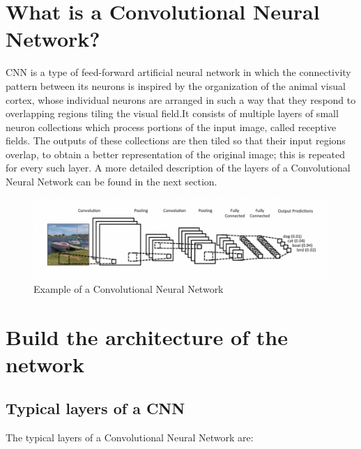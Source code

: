 \documentclass[]{report}
\begin{document}
\section{What is a Convolutional Neural Network?}

CNN is a type of feed-forward artificial neural network in which the connectivity pattern between its neurons is inspired by the organization of the animal visual cortex, whose individual neurons are arranged in such a way that they respond to overlapping regions tiling the visual field.It consists of multiple layers of small neuron collections which process portions of the input image, called receptive fields. The outputs of these collections are then tiled so that their input regions overlap, to obtain a better representation of the original image; this is repeated for every such layer. A more detailed description of the layers of a Convolutional Neural Network can be found in the next section.

\begin{figure}[h]
	\begin{center}
		\includegraphics[scale=0.3]{CNN.png}
		\caption{Example of a Convolutional Neural Network}
		\label{fig:CNN}
	\end{center}
\end{figure}
\newpage
\section{Build the architecture of the network}

\subsection{Typical layers of a CNN}

The typical layers of a Convolutional Neural Network are:
\end{document}
